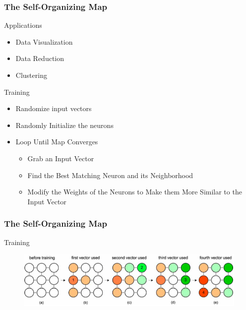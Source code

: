 \documentclass[nototal,handout]{beamer}
\begin{document}
\begin{frame}
	\frametitle{The Self-Organizing Map}
 
\begin{block}{Applications}
 \begin{itemize}
 \item  Data Visualization
 \item  Data Reduction
 \item  Clustering
 \end{itemize}
 \end{block} 
\begin{block}{Training}
 \begin{itemize}
 \item  Randomize input vectors
 \item  Randomly Initialize the neurons
 \item  Loop Until Map Converges
 \begin{itemize}
 \item  Grab an Input Vector
 \item  Find the Best Matching Neuron and its Neighborhood
 \item  Modify the Weights of the Neurons to Make them More Similar to the Input Vector
 \end{itemize}
 \end{itemize}
 \end{block} \end{frame} 

\begin{frame}
	\frametitle{The Self-Organizing Map}
 
\begin{block}{Training}
  \begin{center}
  \begin{figure}
  \includegraphics[width=0.90\linewidth]{training.png}
  \end{figure}
  \end{center}
 \end{block} \end{frame} 
\end{document}
